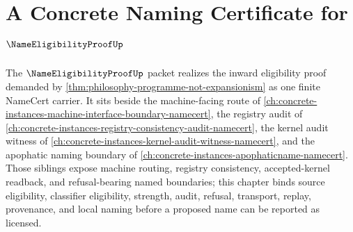 \chapter{A Concrete Naming Certificate for $\NameEligibilityProofUp$}
\label{ch:concrete-instances-name-eligibility-proof-namecert}

The $\NameEligibilityProofUp$ packet realizes the inward eligibility proof demanded by \autoref{thm:philosophy-programme-not-expansionism} as one finite NameCert carrier. It sits beside the machine-facing route of \autoref{ch:concrete-instances-machine-interface-boundary-namecert}, the registry audit of \autoref{ch:concrete-instances-registry-consistency-audit-namecert}, the kernel audit witness of \autoref{ch:concrete-instances-kernel-audit-witness-namecert}, and the apophatic naming boundary of \autoref{ch:concrete-instances-apophaticname-namecert}. Those siblings expose machine routing, registry consistency, accepted-kernel readback, and refusal-bearing named boundaries; this chapter binds source eligibility, classifier eligibility, strength, audit, refusal, transport, replay, provenance, and local naming before a proposed name can be reported as licensed.

